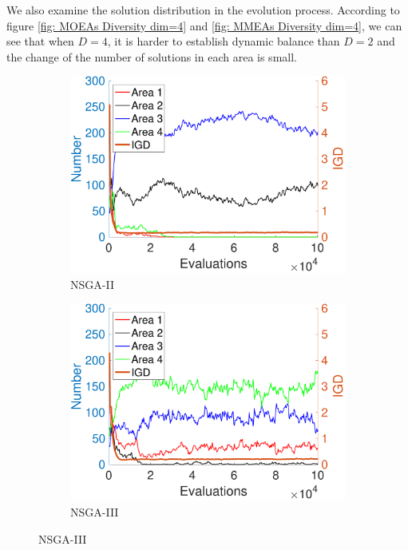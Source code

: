 \documentclass[conference]{IEEEtran}
\begin{document}
We also examine the solution distribution in the evolution process. According to figure \ref{fig: MOEAs Diversity dim=4} and \ref{fig: MMEAs Diversity dim=4}, we can see that when $D=4$, it is harder to establish dynamic balance than $D=2$ and the change of the number of solutions in each area is small.
\begin{figure}[htbp]
    \centering
    \begin{subfigure}[b]{.22\textwidth}
    \includegraphics[width=\linewidth]{Section5/dim4/Diversity/NSGAII}
    \caption{NSGA-II}
    \end{subfigure}
    \begin{subfigure}[b]{.22\textwidth}
    \includegraphics[width=\linewidth]{Section5/dim4/Diversity/NSGAIII}
    \caption{NSGA-III}
    \end{subfigure}
    

\end{figure}
\end{document}
